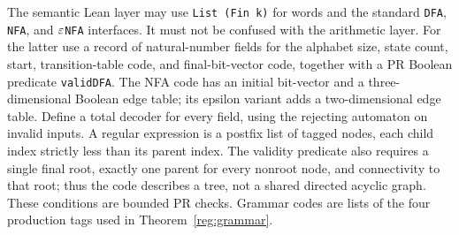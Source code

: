 The semantic Lean layer may use \texttt{List (Fin k)} for words and the
standard \texttt{DFA}, \texttt{NFA}, and \texttt{\ensuremath{\eps}NFA}
interfaces.  It must not be confused with the arithmetic layer.  For the
latter use a record of natural-number fields for the alphabet size, state
count, start, transition-table code, and final-bit-vector code, together
with a PR Boolean predicate \texttt{validDFA}.  The NFA code has an initial
bit-vector and a three-dimensional Boolean edge table; its epsilon variant
adds a two-dimensional edge table.  Define a total decoder for every field,
using the rejecting automaton on invalid inputs.  A regular expression is
a postfix list of tagged nodes, each child index strictly less than its
parent index. The validity predicate also requires a single final root,
exactly one parent for every nonroot node, and connectivity to that root;
thus the code describes a tree, not a shared directed acyclic graph. These
conditions are bounded PR checks.  Grammar codes are lists of the
four production tags used in Theorem~\ref{reg:grammar}.

